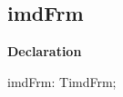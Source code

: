 \documentclass{report}
\newif\ifpdf
\begin{document}
\subsection*{imdFrm}
\fi
\label{xtypefm-imdFrm}
\begin{list}{}{
\setlength{\itemindent}{0cm}
\setlength{\listparindent}{0cm}
\setlength{\leftmargin}{\evensidemargin}
\addtolength{\leftmargin}{\tmplength}
\settowidth{\labelsep}{X}
\addtolength{\leftmargin}{\labelsep}
\setlength{\labelwidth}{\tmplength}
}
\item[\textbf{Declaration}\hfill]
\ifpdf
\begin{flushleft}
\fi
\begin{ttfamily}
imdFrm: TimdFrm;\end{ttfamily}

\ifpdf
\end{flushleft}
\fi

\end{list}
\end{document}

